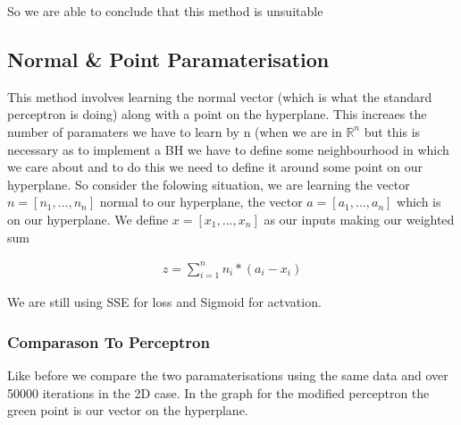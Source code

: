 \documentclass{article}
\begin{document}
So we are able to conclude that this method is unsuitable

\subsection{Normal \& Point Paramaterisation}
This method involves learning the normal vector (which is what the standard perceptron is doing) along with a point on the hyperplane. This increaes the number of paramaters we have to learn by n (when we are in $\mathbb{R}^n$ but this is necessary as to implement a BH we have to define some neighbourhood in which we care about and to do this we need to define it around some point on our hyperplane. So consider the folowing situation, we are learning the vector $n = [n_1, ..., n_n]$ normal to our hyperplane, the vector $a = [a_1, ..., a_n]$ which is on our hyperplane. We define $x = [x_1, ..., x_n]$ as our inputs making our weighted sum

\begin{align*}
z = \sum_{i=1}^n n_i * (a_i - x_i)
\end{align*}

We are still using SSE for loss and Sigmoid for actvation.

\subsubsection{Comparason To Perceptron}
Like before we compare the two paramaterisations using the same data and over 50000 iterations in the 2D case. In the graph for the modified perceptron the green point is our vector on the hyperplane.
\end{document}
